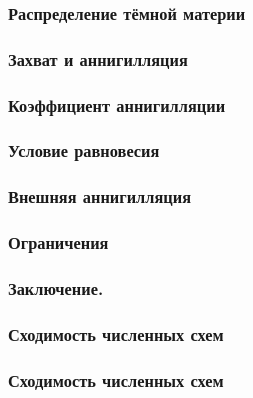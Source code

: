 	

	
	\begin{frame}
		\frametitle{Распределение тёмной материи}
		
	\end{frame}
	\begin{frame}
		\frametitle{Захват и аннигилляция}
		
	\end{frame}
	
	
	\begin{frame}
		\frametitle{Коэффициент аннигилляции}
		
	\end{frame}
	
	
	\begin{frame}
		\frametitle{Условие равновесия}
		
	\end{frame}
	
	\begin{frame}
		\frametitle{Внешняя аннигилляция}
		
	\end{frame}
	
	\begin{frame}
		\frametitle{Ограничения}
		
	\end{frame}
	
	\begin{frame}
		\frametitle{Заключение.}
		
	\end{frame}
	\begin{frame}
		
	\end{frame}
	
	\begin{frame}
		\frametitle{Сходимость численных схем}
		
	\end{frame}
	\begin{frame}
		\frametitle{Сходимость численных схем}
		
	\end{frame}
 

